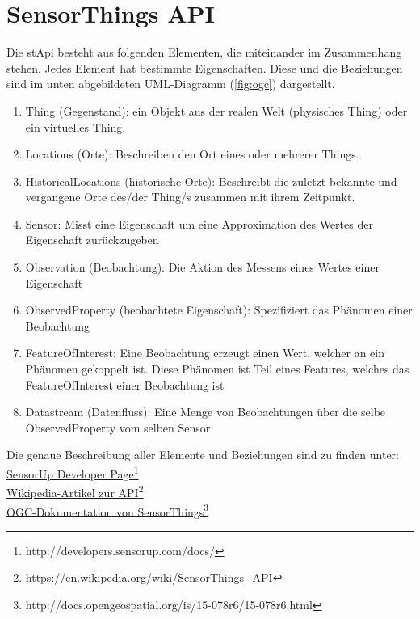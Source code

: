 \documentclass[a4paper, 12 pt]{article}
\begin{document}
\newpage
	\section{SensorThings API}

	Die \gls{stApi} besteht aus folgenden Elementen, die miteinander im Zusammenhang stehen. Jedes Element hat bestimmte Eigenschaften. Diese und die Beziehungen sind im unten abgebildeten UML-Diagramm (\cref{fig:ogc}) dargestellt. \\
	\begin{enumerate}
	
	\item Thing (Gegenstand): ein Objekt aus der realen Welt (physisches Thing) oder ein virtuelles Thing.
	\item Locations (Orte): Beschreiben den Ort eines oder mehrerer Things.
	\item HistoricalLocations (historische Orte): Beschreibt die zuletzt bekannte und vergangene Orte des/der Thing/s zusammen mit ihrem Zeitpunkt.
	\item Sensor: Misst eine Eigenschaft um eine Approximation des Wertes der Eigenschaft zurückzugeben
	\item Observation (Beobachtung): Die Aktion des Messens eines Wertes einer Eigenschaft
	\item ObservedProperty (beobachtete Eigenschaft): Spezifiziert das Phänomen einer Beobachtung
	\item FeatureOfInterest: Eine Beobachtung erzeugt einen Wert, welcher an ein Phänomen gekoppelt ist. Diese Phänomen ist Teil eines Features, welches das FeatureOfInterest einer Beobachtung ist
	\item Datastream (Datenfluss): Eine Menge von Beobachtungen über die selbe ObservedProperty vom selben Sensor   
	\end{enumerate}
	Die genaue Beschreibung aller Elemente und Beziehungen sind zu finden unter: \\
	\href{http://developers.sensorup.com/docs/}{SensorUp Developer Page}\footnote{http://developers.sensorup.com/docs/}\\
	\href{https://en.wikipedia.org/wiki/SensorThings_API}{Wikipedia-Artikel zur API}\footnote{https://en.wikipedia.org/wiki/SensorThings\_API}\\
	\href{http://docs.opengeospatial.org/is/15-078r6/15-078r6.html}{OGC-Dokumentation von SensorThings}\footnote{http://docs.opengeospatial.org/is/15-078r6/15-078r6.html}\\
\end{document}
